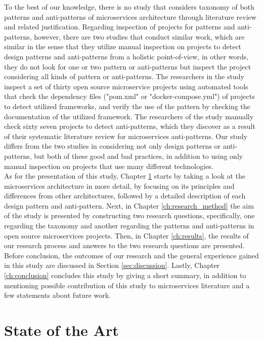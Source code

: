 \documentclass{Configuration_Files/PoliMi3i_thesis}
\begin{document}
To the best of our knowledge, there is no study that considers taxonomy of both patterns and anti-patterns of microservices architecture through literature review and related justification.
Regarding inspection of projects for patterns and anti-patterns, however, there are two studies that conduct similar work, which are similar in the sense that they utilize manual inspection on projects to detect design patterns and anti-patterns from a holistic point-of-view, in other words, they do not look for one or two pattern or anti-patterns but inspect the project considering all kinds of pattern or anti-patterns.
The researchers in the study \cite{8719492} inspect a set of thirty open source microservice projects using automated tools that check the dependency files ("pom.xml" or "docker-compose.yml") of projects to detect utilized frameworks, and verify the use of the pattern by checking the documentation of the utilized framework.
The researchers of the study \cite{10.1145/3424771.3424812} manually check sixty seven projects to detect anti-patterns, which they discover as a result of their systematic literature review for microservices anti-patterns.
Our study differs from the two studies in considering not only design patterns or anti-patterns, but both of these good and bad practices, in addition to using only manual inspection on projects that use many different technologies.
\\
As for the presentation of this study, Chapter \ref{ch:art} starts by taking a look at the microservices architecture in more detail, by focusing on its principles and differences from other architectures, followed by a detailed description of each design pattern and anti-pattern.
Next, in Chapter \ref{ch:research_method} the aim of the study is presented by constructing two research questions, specifically, one regarding the taxonomy and another regarding the patterns and anti-patterns in open source microservices projects.
Then, in Chapter \ref{ch:results}, the results of our research process and answers to the two research questions are presented.
Before conclusion, the outcomes of our research and the general experience gained in this study are discussed in Section \ref{sec:discussion}.
Lastly, Chapter \ref{ch:conclusion} concludes this study by giving a short summary, in addition to mentioning possible contribution of this study to microservices literature and a few statements about future work.

\chapter{State of the Art}
\label{ch:art}%
\end{document}
